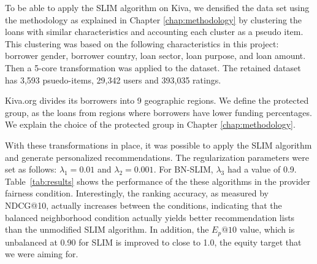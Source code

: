 To be able to apply the SLIM algorithm on Kiva, we densified the data set using the methodology as explained in Chapter \ref{chap:methodology} by clustering the loans with similar characteristics and accounting each cluster as a pseudo item. This clustering was based on the following characteristics in this project: borrower gender, borrower country, loan sector, loan purpose, and loan amount. Then a 5-core transformation was applied to the dataset. The retained dataset has 3,593 psuedo-items, 29,342 users and 393,035 ratings.



Kiva.org divides its borrowers into 9 geographic regions. We define the protected group, as the loans from regions where borrowers have lower funding percentages. We explain the choice of the protected group in Chapter \ref{chap:methodology}.


With these transformations in place, it was possible to apply the SLIM algorithm and generate personalized recommendations. The regularization parameters were set as follows: $\lambda_1 = 0.01$ and $\lambda_2 = 0.001$. For BN-SLIM, $\lambda_3$ had a value of 0.9. Table~\ref{tab:results} shows the performance of the these algorithms in the provider fairness condition. Interestingly, the ranking accuracy, as measured by NDCG@10, actually increases between the conditions, indicating that the balanced neighborhood condition actually yields better recommendation lists than the unmodified SLIM algorithm. In addition, the $E_p@10$ value, which is unbalanced at 0.90 for SLIM is improved to close to 1.0, the equity target that we were aiming for.

